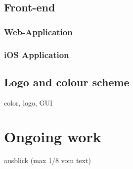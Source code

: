 \section{Front-end}
\subsection{Web-Application}
\subsection{iOS Application}

\section{Logo and colour scheme}
\label{sec:GUI}
color, logo, GUI

\chapter{Ongoing work}
\label{chapter:OngoingWork}
ausblick (max 1/8 vom text)

